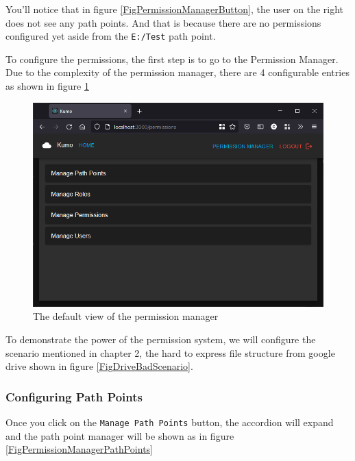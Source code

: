 You'll notice that in figure \ref{FigPermissionManagerButton}, the user on the right does not see any path points. And that is because there are no permissions configured yet aside from the \verb|E:/Test| path point.

To configure the permissions, the first step is to go to the Permission Manager. Due to the complexity of the permission manager, there are 4 configurable entries as shown in figure \ref{FigPermissionManagerHome}

\begin{figure}[htbp]
	\centering
		\includegraphics[scale=0.6]{./figures/chapter4/permission_manager_home.png}
	\caption{The default view of the permission manager}
	\label{FigPermissionManagerHome}
\end{figure}

To demonstrate the power of the permission system, we will configure the scenario mentioned in chapter 2, the hard to express file structure from google drive shown in figure \ref{FigDriveBadScenario}.

\subsubsection{Configuring Path Points}
Once you click on the \verb|Manage Path Points| button, the accordion will expand and the path point manager will be shown as in figure \ref{FigPermissionManagerPathPoints}

